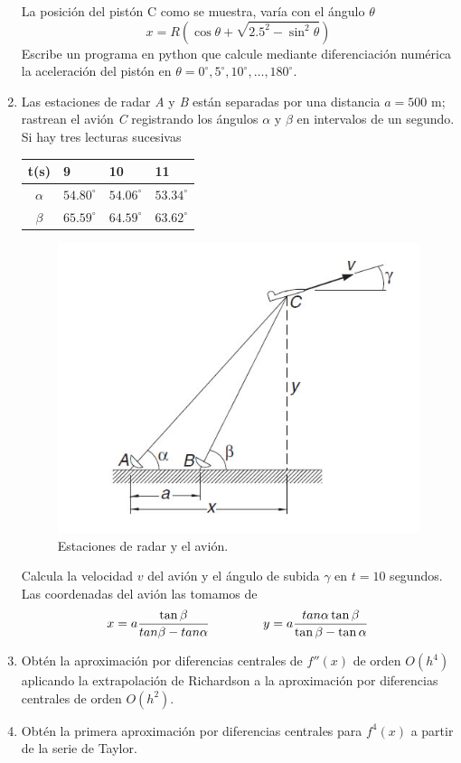 \documentclass[11pt]{article}
\begin{document}
\begin{enumerate}
\begin{center}
\end{center}
La posición del pistón C como se muestra, varía con el ángulo $\theta$
\[x = R \left( \cos \theta + \sqrt{2.5^{2} - \sin^{2} \theta} \right)\]
Escribe un programa en python que calcule mediante diferenciación numérica la aceleración del pistón en $\theta= 0^{\circ}, 5^{\circ}, 10^{\circ},\ldots, 180^{\circ}$.
\item Las estaciones de radar \textit{A} y \textit{B} están separadas por una distancia $a=500$ m; rastrean el avión \textit{C} registrando los ángulos $\alpha$ y $\beta$ en intervalos de un segundo. Si hay tres lecturas sucesivas
\begin{center}
\begin{tabular}{c l l l }
t(s) & 9 & 10 & 11 \\ \hline
$\alpha$ & $54.80^{\circ}$ & $54.06^{\circ}$ & $53.34^{\circ}$ \\ \hline
$\beta$ & $65.59^{\circ}$ & $64.59^{\circ}$ & $63.62^{\circ}$
\end{tabular}
\end{center}
\begin{figure}[H]
	\centering
	\includegraphics[scale=0.6]{Imagenes/ExamenFinal02_01.jpg} 
	\caption{Estaciones de radar y el avión.}
\end{figure}
Calcula la velocidad $v$ del avión y el ángulo de subida $\gamma$ en $t=10$ segundos. Las coordenadas del avión las tomamos de
\[x = a \dfrac{\tan \beta}{tan \beta - tan \alpha} \hspace{1.5cm} y= a\dfrac{tan \alpha \tan \beta}{\tan \beta - \tan \alpha}\]
\item Obtén la aproximación por diferencias centrales de $f''(x)$ de orden $O(h^{4})$ aplicando la extrapolación de Richardson a la aproximación por diferencias centrales de orden $O(h^{2})$.
\item Obtén la primera aproximación por diferencias centrales para $f^{4}(x)$ a partir de la serie de Taylor.
\end{enumerate}
\end{document}
